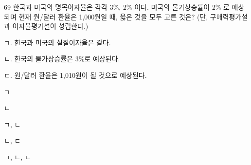 \begin{question}{69}
한국과 미국의 명목이자율은 각각 3\%, 2\% 이다. 미국의 물가상승률이 2\% 로 예상되며 현재 원/달러 환율은 1,000원일 때, 옳은 것을 모두 고른 것은? (단, 구매력평가설과 이자율평가설이 성립한다.)
\begin{framedtext}
ㄱ. 한국과 미국의 실질이자율은 같다. \par
ㄴ. 한국의 물가상승률은 3\%로 예상된다. \par
ㄷ. 원/달러 환율은 1,010원이 될 것으로 예상된다. \par
\end{framedtext}
\begin{choices}
  \item ㄱ
  \item ㄴ
  \item ㄱ, ㄴ
  \item ㄴ, ㄷ
  \item ㄱ, ㄴ, ㄷ
\end{choices}
\end{question}
